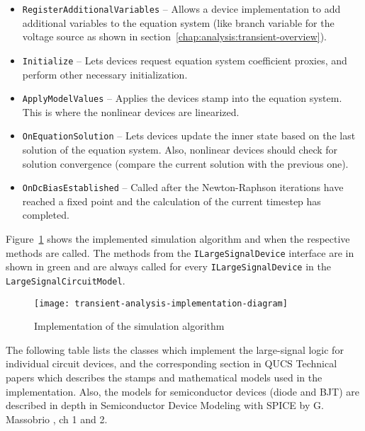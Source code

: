 \begin{itemize}
	\item \texttt{RegisterAdditionalVariables} -- Allows a device implementation to add additional variables to the equation system (like branch variable for the voltage source as shown in section~\ref{chap:analysis:transient-overview}).
	\item \texttt{Initialize} -- Lets devices request equation system coefficient proxies, and perform other necessary initialization.
	\item \texttt{ApplyModelValues} -- Applies the devices stamp into the equation system. This is where the nonlinear devices are linearized.
	\item \texttt{OnEquationSolution} -- Lets devices update the inner state based on the last solution of the equation system. Also, nonlinear devices should check for solution convergence (compare the current solution with the previous one).
	\item \texttt{OnDcBiasEstablished} -- Called after the Newton-Raphson iterations have reached a fixed point and the calculation of the current timestep has completed.
\end{itemize}

Figure~\ref{fig:transient-analysis-implementation-diagram} shows the implemented simulation algorithm and when the respective methods are called. The methods from the \texttt{ILargeSignalDevice} interface are in shown in green and are always called for every \texttt{ILargeSignalDevice} in the \texttt{LargeSignalCircuitModel}.

\begin{figure}[h]
	\centering
	\texttt{[image: transient-analysis-implementation-diagram]}
	\caption{Implementation of the simulation algorithm}
	\label{fig:transient-analysis-implementation-diagram}
\end{figure}

The following table lists the classes which implement the large-signal logic for individual circuit devices, and the corresponding section in QUCS Technical papers which describes the stamps and mathematical models used in the implementation. Also, the models for semiconductor devices (diode and BJT) are described in depth in Semiconductor Device Modeling with SPICE by G. Massobrio \cite{device_modeling}, ch 1 and 2.

